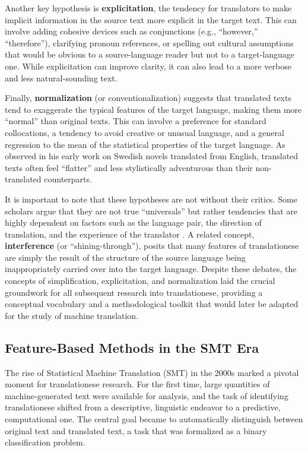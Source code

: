 \documentclass[11pt,a4paper]{article}
\begin{document}
Another key hypothesis is \textbf{explicitation}, the tendency for translators to make implicit information in the source text more explicit in the target text. This can involve adding cohesive devices such as conjunctions (e.g., ``however,'' ``therefore''), clarifying pronoun references, or spelling out cultural assumptions that would be obvious to a source-language reader but not to a target-language one. While explicitation can improve clarity, it can also lead to a more verbose and less natural-sounding text.

Finally, \textbf{normalization} (or conventionalization) suggests that translated texts tend to exaggerate the typical features of the target language, making them more ``normal'' than original texts. This can involve a preference for standard collocations, a tendency to avoid creative or unusual language, and a general regression to the mean of the statistical properties of the target language. As \citet{gellerstam1986translationese} observed in his early work on Swedish novels translated from English, translated texts often feel ``flatter'' and less stylistically adventurous than their non-translated counterparts.

It is important to note that these hypotheses are not without their critics. Some scholars argue that they are not true ``universals'' but rather tendencies that are highly dependent on factors such as the language pair, the direction of translation, and the experience of the translator \cite{zanettin2013corpus}. A related concept, \textbf{interference} (or ``shining-through''), posits that many features of translationese are simply the result of the structure of the source language being inappropriately carried over into the target language. Despite these debates, the concepts of simplification, explicitation, and normalization laid the crucial groundwork for all subsequent research into translationese, providing a conceptual vocabulary and a methodological toolkit that would later be adapted for the study of machine translation.

\subsection{Feature-Based Methods in the SMT Era}

The rise of Statistical Machine Translation (SMT) in the 2000s marked a pivotal moment for translationese research. For the first time, large quantities of machine-generated text were available for analysis, and the task of identifying translationese shifted from a descriptive, linguistic endeavor to a predictive, computational one. The central goal became to automatically distinguish between original text and translated text, a task that was formalized as a binary classification problem.
\end{document}

